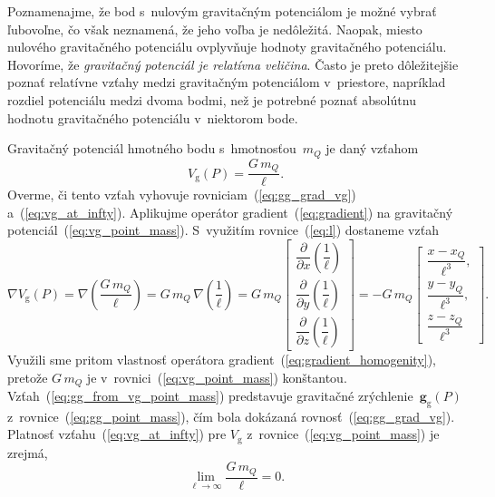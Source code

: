 \documentclass[a4paper,12pt]{book}
\newcommand{\gidx}{\mathrm g}
\let\vec\mathbf
\begin{document}
Poznamenajme, že bod s~nulovým gravitačným potenciálom je možné vybrať 
ľubovoľne, čo však neznamená, že jeho voľba je nedôležitá.  Naopak, miesto 
nulového gravitačného potenciálu ovplyvňuje hodnoty gravitačného potenciálu.  
Hovoríme, že \emph{gravitačný potenciál je relatívna veličina}.  Často je preto 
dôležitejšie poznať relatívne vzťahy medzi gravitačným potenciálom v~priestore, 
napríklad rozdiel potenciálu medzi dvoma bodmi, než je potrebné poznať 
absolútnu hodnotu gravitačného potenciálu v~niektorom bode.

Gravitačný potenciál hmotného bodu s~hmotnosťou~$m_Q$ je daný vzťahom
%
\begin{equation}
\label{eq:vg_point_mass}
V_\gidx(P) = \frac{G \, m_Q}{\ell}{.}
\end{equation}
%
Overme, či tento vzťah vyhovuje rovniciam~(\ref{eq:gg_grad_vg})
a~(\ref{eq:vg_at_infty}).  Aplikujme operátor gradient~(\ref{eq:gradient})
na gravitačný potenciál~(\ref{eq:vg_point_mass}).  S~využitím 
rovnice~(\ref{eq:l}) dostaneme vzťah
%
\begin{equation}
\label{eq:gg_from_vg_point_mass}
\nabla V_\gidx(P) = \nabla \left( \frac{G \, m_Q}{\ell} \right) = G \, m_Q \, 
\nabla \left( \frac{1}{\ell} \right) =
%
G \, m_Q
%
\begin{bmatrix}
\dfrac{\partial}{\partial x} \left( \dfrac{1}{\ell} \right)\\[2ex]
\dfrac{\partial}{\partial y} \left( \dfrac{1}{\ell} \right)\\[2ex]
\dfrac{\partial}{\partial z} \left( \dfrac{1}{\ell} \right)
\end{bmatrix}
%
=
%
-G \, m_Q
%
\begin{bmatrix}
\dfrac{x - x_Q}{\ell^3}{,}\\[2ex]
\dfrac{y - y_Q}{\ell^3}{,}\\[2ex]
\dfrac{z - z_Q}{\ell^3}
\end{bmatrix}
{.}
\end{equation}
%
Využili sme pritom vlastnosť operátora gradient~(\ref{eq:gradient_homogenity}), 
pretože $G \, m_Q$ je v~rovnici~(\ref{eq:vg_point_mass}) konštantou.  
Vzťah~(\ref{eq:gg_from_vg_point_mass}) predstavuje gravitačné zrýchlenie~$\vec 
g_\gidx(P)$ z~rovnice~(\ref{eq:gg_point_mass}), čím bola dokázaná 
rovnosť~(\ref{eq:gg_grad_vg}).  Platnosť vzťahu~(\ref{eq:vg_at_infty}) pre 
$V_\gidx$ z~rovnice~(\ref{eq:vg_point_mass}) je zrejmá,
%
\begin{equation}
\lim_{\ell \to \infty} \frac{G \, m_Q}{\ell} = 0{.}
\end{equation}
\end{document}
